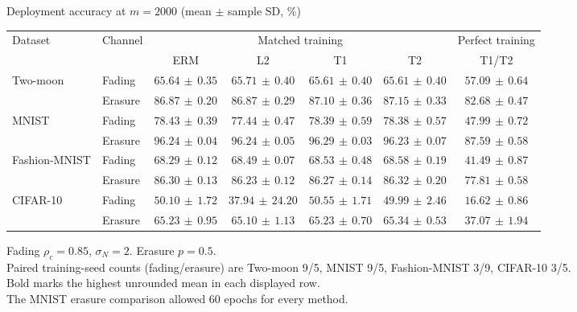 \documentclass[border=4pt]{standalone}
\begin{document}
\begin{minipage}{7.8in}
\centering
Deployment accuracy at $m=2000$ (mean $\pm$ sample SD, \%)\\[4pt]
\begin{tabular*}{\linewidth}{@{\extracolsep{\fill}}llccccc@{}}
\toprule
\multirow{2}{*}{Dataset} & \multirow{2}{*}{Channel} & \multicolumn{4}{c}{Matched training} & Perfect training \\
\cmidrule(lr){3-6}\cmidrule(l){7-7}
 & & ERM & L2 & T1 & T2 & T1/T2 \\
\midrule
\multirow{2}{*}{Two-moon} & Fading & $65.64\,\pm\,0.35$ & $\mathbf{65.71}\,\pm\,0.40$ & $65.61\,\pm\,0.40$ & $65.61\,\pm\,0.40$ & $57.09\,\pm\,0.64$ \\
 & Erasure & $86.87\,\pm\,0.20$ & $86.87\,\pm\,0.29$ & $87.10\,\pm\,0.36$ & $\mathbf{87.15}\,\pm\,0.33$ & $82.68\,\pm\,0.47$ \\
\midrule[0.25pt]
\multirow{2}{*}{MNIST} & Fading & $\mathbf{78.43}\,\pm\,0.39$ & $77.44\,\pm\,0.47$ & $78.39\,\pm\,0.59$ & $78.38\,\pm\,0.57$ & $47.99\,\pm\,0.72$ \\
 & Erasure & $96.24\,\pm\,0.04$ & $96.24\,\pm\,0.05$ & $\mathbf{96.29}\,\pm\,0.03$ & $96.23\,\pm\,0.07$ & $87.59\,\pm\,0.58$ \\
\midrule[0.25pt]
\multirow{2}{*}{Fashion-MNIST} & Fading & $68.29\,\pm\,0.12$ & $68.49\,\pm\,0.07$ & $68.53\,\pm\,0.48$ & $\mathbf{68.58}\,\pm\,0.19$ & $41.49\,\pm\,0.87$ \\
 & Erasure & $86.30\,\pm\,0.13$ & $86.23\,\pm\,0.12$ & $86.27\,\pm\,0.14$ & $\mathbf{86.32}\,\pm\,0.20$ & $77.81\,\pm\,0.58$ \\
\midrule[0.25pt]
\multirow{2}{*}{CIFAR-10} & Fading & $50.10\,\pm\,1.72$ & $37.94\,\pm\,24.20$ & $\mathbf{50.55}\,\pm\,1.71$ & $49.99\,\pm\,2.46$ & $16.62\,\pm\,0.86$ \\
 & Erasure & $65.23\,\pm\,0.95$ & $65.10\,\pm\,1.13$ & $65.23\,\pm\,0.70$ & $\mathbf{65.34}\,\pm\,0.53$ & $37.07\,\pm\,1.94$ \\
\bottomrule
\end{tabular*}
\par\smallskip\raggedright\footnotesize
Fading $\rho_c=0.85$, $\sigma_N=2$. Erasure $p=0.5$.\\
Paired training-seed counts (fading/erasure) are Two-moon 9/5, MNIST 9/5, Fashion-MNIST 3/9, CIFAR-10 3/5.\\
Bold marks the highest unrounded mean in each displayed row.\\
The MNIST erasure comparison allowed 60 epochs for every method.
\end{minipage}
\end{document}
